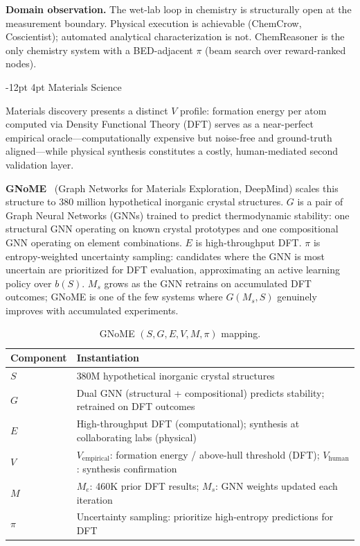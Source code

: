 \documentclass[11pt]{article}
\makeatletter
\renewcommand\subsection{\@startsection{subsection}{2}{\z@}%
  {-12pt \@plus -2pt \@minus -2pt}%
  {4pt \@plus 1pt}%
  {\normalfont\normalsize\bfseries}}
\newcommand{\sgmvpi}{$(S, G, E, V, M, \pi)$}
\makeatother
\begin{document}
\textbf{Domain observation.} The wet-lab loop in chemistry is structurally open at the measurement boundary. Physical execution is achievable (ChemCrow, Coscientist); automated analytical characterization is not. ChemReasoner is the only chemistry system with a BED-adjacent $\pi$ (beam search over reward-ranked nodes).

\subsection{Materials Science}

Materials discovery presents a distinct $V$ profile: formation energy per atom computed via Density Functional Theory (DFT) serves as a near-perfect empirical oracle---computationally expensive but noise-free and ground-truth aligned---while physical synthesis constitutes a costly, human-mediated second validation layer.

\textbf{GNoME}~\citep{merchant2023gnome} (Graph Networks for Materials Exploration, DeepMind) scales this structure to 380 million hypothetical inorganic crystal structures. $G$ is a pair of Graph Neural Networks (GNNs) trained to predict thermodynamic stability: one structural GNN operating on known crystal prototypes and one compositional GNN operating on element combinations. $E$ is high-throughput DFT. $\pi$ is entropy-weighted uncertainty sampling: candidates where the GNN is most uncertain are prioritized for DFT evaluation, approximating an active learning policy over $b(S)$. $M_s$ grows as the GNN retrains on accumulated DFT outcomes; GNoME is one of the few systems where $G(M_s, S)$ genuinely improves with accumulated experiments.

\begin{table}[h]
\centering
\small
\begin{tabular}{@{}lp{9cm}@{}}
\toprule
Component & Instantiation \\
\midrule
$S$ & 380M hypothetical inorganic crystal structures \\
$G$ & Dual GNN (structural + compositional) predicts stability; retrained on DFT outcomes \\
$E$ & High-throughput DFT (computational); synthesis at collaborating labs (physical) \\
$V$ & $V_\text{empirical}$: formation energy / above-hull threshold (DFT); $V_\text{human}$: synthesis confirmation \\
$M$ & $M_e$: 460K prior DFT results; $M_s$: GNN weights updated each iteration \\
$\pi$ & Uncertainty sampling: prioritize high-entropy predictions for DFT \\
\bottomrule
\end{tabular}
\caption{GNoME \sgmvpi{} mapping.}
\end{table}
\end{document}
